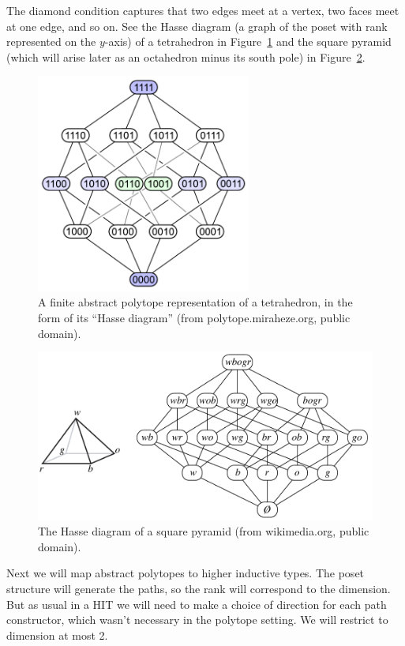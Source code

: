 The diamond condition captures that two edges meet at a vertex, two faces meet at one edge, and so on. See the Hasse diagram (a graph of the poset with rank represented on the \( y \)-axis) of a tetrahedron in Figure~\ref{fig:hasse_tetrahedron} and the square pyramid (which will arise later as an octahedron minus its south pole) in Figure~\ref{fig:hasse_pyramid}.

\begin{figure}[htbp]
\centering
\includegraphics[width=200pt]{hasse_tetrahedron.pdf}
\caption{A finite abstract polytope representation of a tetrahedron, in the form of its ``Hasse diagram'' (from polytope.miraheze.org, public domain).}
\label{fig:hasse_tetrahedron}
\end{figure}

\begin{figure}[htbp]
\centering
\includegraphics[width=350pt]{pyramid.pdf}
\caption{The Hasse diagram of a square pyramid (from wikimedia.org, public domain).}
\label{fig:hasse_pyramid}
\end{figure}

Next we will map abstract polytopes to higher inductive types. The poset structure will generate the paths, so the rank will correspond to the dimension. But as usual in a HIT we will need to make a choice of direction for each path constructor, which wasn't necessary in the polytope setting. We will restrict to dimension at most 2.

